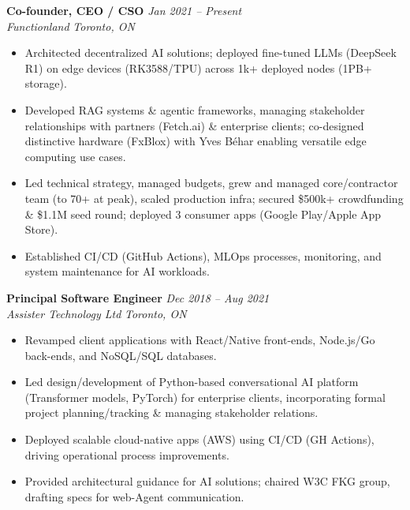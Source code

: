 \documentclass[10pt, a4paper]{article} %
\begin{document}
\noindent\textbf{Co-founder, CEO / CSO} \hfill \small\textit{Jan 2021 – Present} \\
\noindent\textit{Functionland} \hfill \small\textit{Toronto, ON}
\vspace{1pt}
\begin{itemize}[label=\tiny\textbullet]
    \item Architected decentralized AI solutions; deployed fine-tuned LLMs (DeepSeek R1) on edge devices (RK3588/TPU) across 1k+ deployed nodes (1PB+ storage).
    \item Developed RAG systems \& agentic frameworks, managing stakeholder relationships with partners (Fetch.ai) \& enterprise clients; co-designed distinctive hardware (FxBlox) with Yves Béhar enabling versatile edge computing use cases.
    \item Led technical strategy, managed budgets, grew and managed core/contractor team (to 70+ at peak), scaled production infra; secured \$500k+ crowdfunding \& \$1.1M seed round; deployed 3 consumer apps (Google Play/Apple App Store).
    \item Established CI/CD (GitHub Actions), MLOps processes, monitoring, and system maintenance for AI workloads.
\end{itemize}

\vspace{3pt} %
\noindent\textbf{Principal Software Engineer} \hfill \small\textit{Dec 2018 – Aug 2021} \\
\noindent\textit{Assister Technology Ltd} \hfill \small\textit{Toronto, ON}
\vspace{1pt}
\begin{itemize}[label=\tiny\textbullet]
    \item Revamped client applications with React/Native front-ends, Node.js/Go back-ends, and NoSQL/SQL databases.
    \item Led design/development of Python-based conversational AI platform (Transformer models, PyTorch) for enterprise clients, incorporating formal project planning/tracking \& managing stakeholder relations.
    \item Deployed scalable cloud-native apps (AWS) using CI/CD (GH Actions), driving operational process improvements.
    \item Provided architectural guidance for AI solutions; chaired W3C FKG group, drafting specs for web-Agent communication.
\end{itemize}
\end{document}
